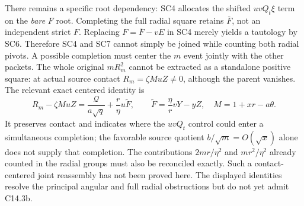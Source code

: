 There remains a specific root dependency: SC4 allocates the shifted
$uvQ_t\xi$ term on the \emph{bare} $F$ root. Completing the full
radial square retains $\overline F$, not an independent strict $F$.
Replacing $F=\overline F-vE$ in SC4 merely yields a tautology by
SC6. Therefore SC4 and SC7 cannot simply be joined while counting
both radial pivots. A possible completion must center the $m$ event jointly with the
other packets. The whole original $mR_m^2$ cannot be extracted as a
standalone positive square: at actual source contact
$R_m=\zeta M uZ\ne0$, although the parent vanishes. The relevant
exact centered identity is
\[
 R_m-\zeta M uZ
 =\frac{\mathcal Q}{a\sqrt q}
        +\frac r\eta u\widetilde F,\qquad
 \widetilde F=\frac\eta r vY-yZ,\quad
 M=1+xr-a\theta.                                      \tag{SC8}
\]
It preserves contact and indicates where the $uvQ_t$ control could
enter a simultaneous completion; the favorable source quotient
$b/\sqrt m=O(\sqrt x)$ alone does not supply that completion.
The contributions $2mr/\eta^2$ and $mr^2/\eta^2$ already counted
in the radial groups must also be reconciled exactly. Such a
contact-centered joint reassembly has not been proved here.
The displayed identities resolve the principal angular and full radial
obstructions but do not yet admit C14.3b.

